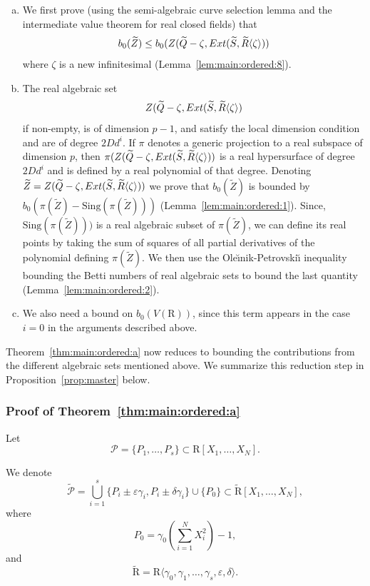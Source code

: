 \documentclass[10pt]{amsart}
\theoremstyle{definition}
\theoremstyle{remark}
\numberwithin{equation}{section}
\newcommand {\R} {\mathrm{R}}
\newcommand {\ZZ} {{\rm Z}}
\newcommand {\la}   {{\langle}}
\newcommand {\ra}   {{\rangle}}
\newcommand {\eps} {{\varepsilon}}
\newcommand {\E} {{\rm Ext}}
\newcommand{\Sing}{\mathrm{Sing}}
\begin{document}
\begin{enumerate}[(a)]
\item
We first prove (using the semi-algebraic curve selection lemma and 
the intermediate value theorem for real closed fields) that 
\[
b_0(\widetilde{Z}) \leq  b_0(\ZZ(\widetilde{Q} - \zeta, \E(\widetilde{S},\widetilde{R}\la\zeta\ra))
\]
where $\zeta$ is a new infinitesimal
(Lemma~\ref{lem:main:ordered:8}).
\item 
The real algebraic set
\[
\ZZ(\widetilde{Q} - \zeta, \E(\widetilde{S},\widetilde{R}\la\zeta\ra)
\]
if non-empty, is of dimension $p-1$, and satisfy the local dimension condition and are of degree $2 D d^i$.
If
$\pi$ denotes a generic projection  to a real subspace of dimension $p$,
then 
$\pi(\ZZ(\widetilde{Q} - \zeta, \E(\widetilde{S},\widetilde{R}\la\zeta\ra))$ 
is a real hypersurface of degree $2Dd^i$ and is 
defined by a real polynomial of that degree.
Denoting 
$\widetilde{Z} = 
\ZZ(\widetilde{Q} - \zeta, \E(\widetilde{S},\widetilde{R}\la\zeta\ra))$
we prove that 
$b_0(\widetilde{Z})$
is bounded by $b_0(\pi(\widetilde{Z}) -  \Sing(\pi(\widetilde{Z})))$
(Lemma~\ref{lem:main:ordered:1}).
Since, $\Sing(\pi(\widetilde{Z})))$ is a real algebraic subset of 
$\pi(\widetilde{Z})$, we can define its real points by taking the sum of squares of all partial derivatives of the polynomial defining $\pi(\widetilde{Z})$.
We then use the Ole{\u\i}nik-Petrovski{\u\i} inequality \cite{OP} bounding the Betti numbers of real algebraic sets to bound the last quantity
(Lemma~\ref{lem:main:ordered:2}). 
\item We also need a bound on $b_0(V(\R))$, since this term appears in the case $i=0$ in the arguments described above.
\end{enumerate}

Theorem~\ref{thm:main:ordered:a} now reduces to bounding the contributions from the different algebraic sets mentioned above. 
 We summarize this reduction step in Proposition~\ref{prop:master} below.




\subsubsection{Proof of Theorem~\ref{thm:main:ordered:a}}
Let 
\[
\mathcal{P} = \{P_1,\ldots,P_s\} \subset \R[X_1,\ldots,X_N].
\]


We denote 
\[
\widetilde{\mathcal{P}} = \bigcup_{i=1}^{s} \{P_i \pm \eps \gamma_i, P_i \pm \delta \gamma_i\} \cup
\{P_0\} \subset \widetilde{\R}[X_1,\ldots,X_N],
\]
where
\[
P_0 = \gamma_0\left( \sum_{i=1}^N X_i^2 \right) - 1,
\]
and
\[
\widetilde{\R} = \R\la\gamma_0,\gamma_1,\ldots,\gamma_s,\eps,\delta\ra.
\]
\end{document}
